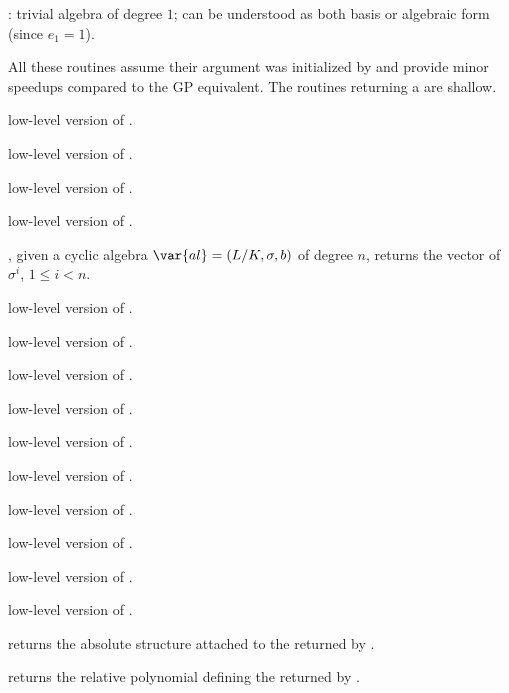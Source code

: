\item {}: trivial algebra of degree $1$; can be understood
as both basis or algebraic form (since $e_1 = 1$).


All these routines assume their argument was initialized by 
and provide minor speedups compared to the GP equivalent. The routines
returning a  are shallow.

 low-level version of .

 low-level version of .

 low-level version of .

 low-level version of .

, given a cyclic algebra $\var{al} =
(L/K,\sigma,b)$ of degree $n$, returns the vector of $\sigma^i$,
$1 \leq i < n$.

 low-level version of .

 low-level version of .

 low-level version of .

 low-level version of .

 low-level version of .

 low-level version of .

 low-level version of .

 low-level version of .

 low-level version of
.

low-level version of .

 returns the absolute 
structure attached to the  returned by .

  returns the relative polynomial
defining the  returned by .

